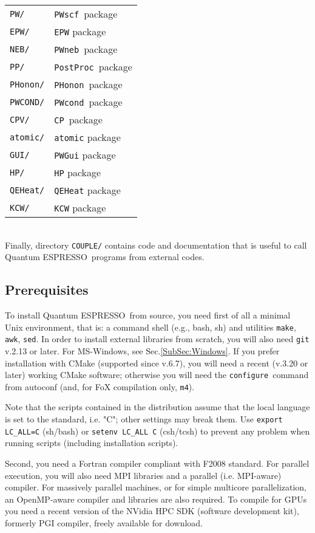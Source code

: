 \documentclass[12pt,a4paper]{article}
\def\qe{{\sc Quantum ESPRESSO}}
\def\configure{\texttt{configure}}
\def\PWscf{\texttt{PWscf}}
\def\PHonon{\texttt{PHonon}}
\def\CP{\texttt{CP}}
\def\PostProc{\texttt{PostProc}}
\def\NEB{\texttt{PWneb}}
\def\make{\texttt{make}}
\begin{document}
\begin{tabular}{ll}
\texttt{PW/}      & \PWscf\ package\\
\texttt{EPW/}     & \texttt{EPW} package\\
\texttt{NEB/}     & \NEB\ package\\
\texttt{PP/}      & \PostProc\ package\\
\texttt{PHonon/}  & \PHonon\ package\\
\texttt{PWCOND/}  & \texttt{PWcond}\ package\\
\texttt{CPV/}     & \CP\ package\\
\texttt{atomic/}  & \texttt{atomic} package\\
\texttt{GUI/}     & \texttt{PWGui} package\\
\texttt{HP/}      & \texttt{HP} package\\
\texttt{QEHeat/}  & \texttt{QEHeat} package\\
\texttt{KCW/}     & \texttt{KCW} package
\end{tabular}
\\

Finally, directory \texttt{COUPLE/} contains code and documentation
that is useful to call \qe\ programs from external codes.
\subsection{Prerequisites}
\label{Sec:Installation}

To install \qe\ from source, you need first of all a minimal Unix
environment, that is: a command shell (e.g., bash, sh) and utilities \make,
\texttt{awk}, \texttt{sed}. In order to install external
libraries from scratch, you will also need \texttt{git} v.2.13 or later.
For MS-Windows, see Sec.\ref{SubSec:Windows}.
If you prefer installation with CMake (supported since v.6.7), 
you will need a recent (v.3.20 or later) working CMake software;
otherwise you will need the \configure\ command from autoconf
(and, for FoX compilation only, \texttt{m4}).

Note that the scripts contained
in the distribution assume that the local  language is set to the
standard, i.e. "C"; other settings
may break them. Use \texttt{export LC\_ALL=C} (sh/bash) or
\texttt{setenv LC\_ALL C} (csh/tcsh) to prevent any problem
when running scripts (including installation scripts).

Second, you need a Fortran compiler compliant with F2008 standard.
For parallel execution, you will also need MPI libraries and a parallel
(i.e. MPI-aware) compiler. For massively parallel machines, or
for simple multicore parallelization, an OpenMP-aware compiler
and libraries are also required. To compile for GPUs you need a
recent version of the NVidia HPC SDK (software development kit),
formerly PGI compiler, freely available for download.
\end{document}
